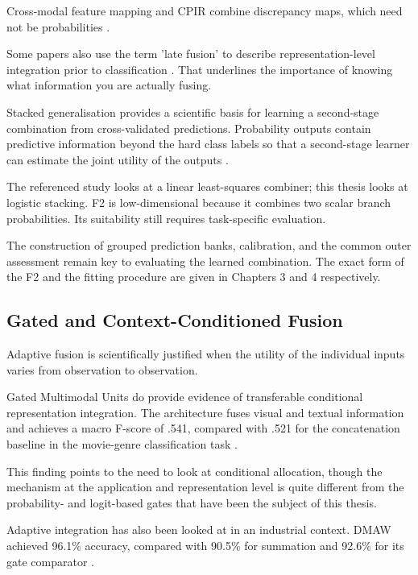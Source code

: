Cross-modal feature mapping and CPIR combine discrepancy maps, which need not be probabilities
\citep{Costanzino2024Multimodal,Shangguan2025CPIR}.

Some papers also use the term 'late fusion' to describe representation-level integration prior to
classification \citep{Wang2020What,Xie2025Audiovisual}. That underlines the importance of knowing
what information you are actually fusing.

Stacked generalisation provides a scientific basis for learning a second-stage combination from
cross-validated predictions. Probability outputs contain predictive information beyond the hard
class labels so that a second-stage learner can estimate the joint utility of the outputs
\citep[Sections~2--3]{Ting1999Issues}.

The referenced study looks at a linear least-squares combiner; this thesis looks at logistic
stacking. F2 is low-dimensional because it combines two scalar branch probabilities. Its suitability
still requires task-specific evaluation.

The construction of grouped prediction banks, calibration, and the common outer assessment remain
key to evaluating the learned combination. The exact form of the F2 and the fitting procedure are
given in Chapters 3 and 4 respectively.

\subsection{Gated and Context-Conditioned Fusion}

Adaptive fusion is scientifically justified when the utility of the individual inputs varies from
observation to observation.

Gated Multimodal Units do provide evidence of transferable conditional representation integration.
The architecture fuses visual and textual information and achieves a macro F-score of .541, compared
with .521 for the concatenation baseline in the movie-genre classification task \citep[Section~3,
Table~2]{P006}.

This finding points to the need to look at conditional allocation, though the mechanism at the
application and representation level is quite different from the probability- and logit-based gates
that have been the subject of this thesis.

Adaptive integration has also been looked at in an industrial context. DMAW achieved 96.1\%
accuracy, compared with 90.5\% for summation and 92.6\% for its gate comparator \citep[PDF p.~9,
Table~V]{P003}.

